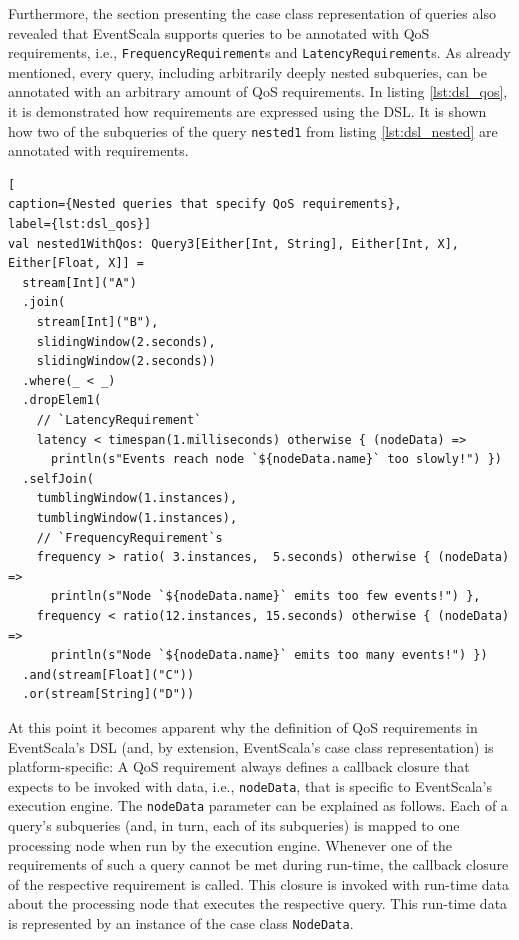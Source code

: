\documentclass[article, 10pt, type=bsc, colorback, accentcolor=tud8b, parskip=half, bibliography=totocnumbered]{tudthesis}
\begin{document}
Furthermore, the section presenting the case class representation of queries also revealed that EventScala supports queries to be annotated with QoS requirements, i.e., \lstinline{FrequencyRequirement}s and  \lstinline{LatencyRequirement}s.
As already mentioned, every query, including arbitrarily deeply nested subqueries, can be annotated with an arbitrary amount of QoS requirements.
In listing \ref{lst:dsl_qos}, it is demonstrated how requirements are expressed using the DSL.
It is shown how two of the subqueries of the query \lstinline{nested1} from listing \ref{lst:dsl_nested} are annotated with requirements.

\begin{lstlisting}[
caption={Nested queries that specify QoS requirements},
label={lst:dsl_qos}]
val nested1WithQos: Query3[Either[Int, String], Either[Int, X], Either[Float, X]] =
  stream[Int]("A")
  .join(
    stream[Int]("B"),
    slidingWindow(2.seconds),
    slidingWindow(2.seconds))
  .where(_ < _)
  .dropElem1(
    // `LatencyRequirement`
    latency < timespan(1.milliseconds) otherwise { (nodeData) =>
      println(s"Events reach node `${nodeData.name}` too slowly!") })
  .selfJoin(
    tumblingWindow(1.instances),
    tumblingWindow(1.instances),
    // `FrequencyRequirement`s
    frequency > ratio( 3.instances,  5.seconds) otherwise { (nodeData) =>
      println(s"Node `${nodeData.name}` emits too few events!") },
    frequency < ratio(12.instances, 15.seconds) otherwise { (nodeData) =>
      println(s"Node `${nodeData.name}` emits too many events!") })
  .and(stream[Float]("C"))
  .or(stream[String]("D"))
\end{lstlisting}

At this point it becomes apparent why the definition of QoS requirements in EventScala's DSL (and, by extension, EventScala's case class representation) is platform-specific:
A QoS requirement always defines a callback closure that expects to be invoked with data, i.e., \lstinline{nodeData}, that is specific to EventScala's execution engine.
The \lstinline{nodeData} parameter can be explained as follows.
Each of a query's subqueries (and, in turn, each of its subqueries) is mapped to one processing node when run by the execution engine.
Whenever one of the requirements of such a query cannot be met during run-time, the callback closure of the respective requirement is called.
This closure is invoked with run-time data about the processing node that executes the respective query.
This run-time data is represented by an instance of the case class \lstinline{NodeData}.
\end{document}
